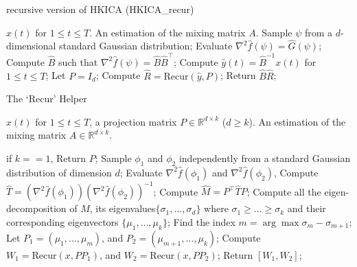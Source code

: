 \documentclass{article}
\newcommand{\real}{\mathbb{R}}
\newcommand{\R}{\real}
\theoremstyle{definition}
\begin{document}
\begin{algorithm} 
\caption{recursive version of HKICA (HKICA\_recur)}
\label{alg:HKICA_recur}
\begin{algorithmic}[1]
\INPUT $x(t)$ for $1\le t \le T$. 
\OUTPUT An estimation of the mixing matrix $A$. 
\STATE Sample $\psi$ from a $d$-dimensional standard Gaussian distribution;
\STATE Evaluate $\nabla^2\hat{f}(\psi) = \hat{G}(\psi)$; \\
\STATE Compute $\hat{B}$ such that $\nabla^2\hat{f}(\psi) = \hat{B}\hat{B}^{\top}$;
\STATE Compute $\hat{y}(t) = \hat{B}^{-1}x(t)$ for $1\le t \le T$;
\STATE Let $P = I_d$;
\STATE Compute $\hat{R} = \text{Recur}(\hat{y}, P)$;
\STATE Return $\hat{B}\hat{R}$;
\end{algorithmic}
\end{algorithm}
\begin{algorithm} 
\caption{The `Recur' Helper}
\label{alg:recur}
\begin{algorithmic}[1]
\INPUT $x(t)$ for $1\le t \le T$, a projection matrix $P\in \R^{d\times k}$ ($d\ge k$). 
\OUTPUT An estimation of the mixing matrix $A\in \R^{d\times k}$. 

\STATE if $k==1$, Return $P$;
\STATE Sample $\phi_1$ and $\phi_2$ independently from a standard Gaussian distribution of dimension $d$;
\STATE Evaluate $\nabla^2\hat{f}(\phi_1)$ and $\nabla^2\hat{f}(\phi_2)$, 
\STATE Compute $\hat{T} = (\nabla^2 \hat{f}(\phi_1))(\nabla^2\hat{f}(\phi_2))^{-1}$;
\STATE Compute $\hat{M} = P^{\top} \hat{T} P$;
\STATE Compute all the eigen-decomposition of $\hat{M}$, its eigenvalues$\{\sigma_1,\ldots,\sigma_d\}$ where $\sigma_1\ge\ldots\ge \sigma_k$ and their corresponding eigenvectors $\{\mu_1,\ldots, \mu_k\}$;
\STATE Find the index $m = \arg\max \sigma_m - \sigma_{m+1}$; 
\STATE Let $P_1 = (\mu_1,\ldots,\mu_m)$, and $P_2 = (\mu_{m+1},\ldots,\mu_k)$;
\STATE Compute $W_1 = \text{Recur} (x, PP_1)$, and  $W_2 = \text{Recur} (x, PP_2)$;
\STATE Return $[W_1,W_2]$;
\end{algorithmic}
\end{algorithm}
\end{document}
